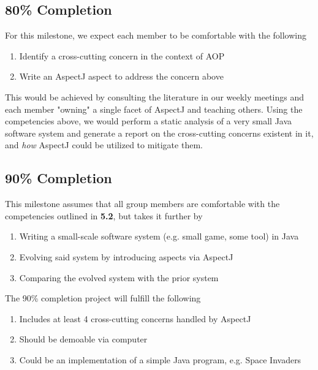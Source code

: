 \documentclass[sigconf]{acmart}
\begin{document}
\subsection{80\% Completion}
For this milestone, we expect each member to be comfortable with the following
\begin{enumerate}
    \item Identify a cross-cutting concern in the context of AOP
    \item Write an AspectJ aspect to address the concern above
\end{enumerate}
This would be achieved by consulting the literature in our weekly meetings and each member "owning" a single facet of AspectJ and teaching others. Using the competencies above, we would perform a static analysis of a very small Java software system and generate a report on the cross-cutting concerns existent in it, and \textit{how} AspectJ could be utilized to mitigate them.

\subsection{90\% Completion}
This milestone assumes that all group members are comfortable with the competencies outlined in \textbf{5.2}, but takes it further by
\begin{enumerate}
    \item Writing a small-scale software system (e.g. small game, some tool) in Java
    \item Evolving said system by introducing aspects via AspectJ
    \item Comparing the evolved system with the prior system
\end{enumerate}

The 90\% completion project will fulfill the following
\begin{enumerate}
    \item Includes at least 4 cross-cutting concerns handled by AspectJ
    \item Should be demoable via computer
    \item Could be an implementation of a simple Java program, e.g. Space Invaders
\end{enumerate}
\end{document}
